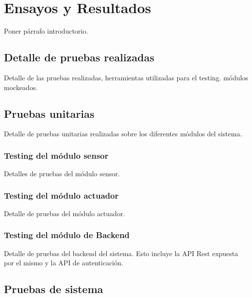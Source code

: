 
\chapter{Ensayos y Resultados} %

\label{Chapter4} %

Poner párrafo introductorio.



\section{Detalle de pruebas realizadas}

Detalle de las pruebas realizadas, herramientas utilizadas para el testing. módulos mockeados.

\section{Pruebas unitarias}

Detalle de pruebas unitarias realizadas sobre los diferentes módulos del sistema.

\subsection{Testing del módulo sensor}

Detalles de pruebas del módulo sensor.

\subsection{Testing del módulo actuador}

Detalle de pruebas del módulo actuador.

\subsection{Testing del módulo de Backend}

Detalle de pruebas del backend del sistema. Esto incluye la API Rest expuesta por el mismo y la API de autenticación.

\section{Pruebas de sistema}

